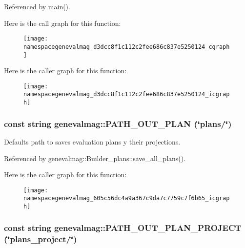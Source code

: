Referenced by main().

Here is the call graph for this function:\nopagebreak
\begin{figure}[H]
\begin{center}
\leavevmode
\texttt{[image: namespacegenevalmag\_d3dcc8f1c112c2fee686c837e5250124\_cgraph]}
\end{center}
\end{figure}


Here is the caller graph for this function:\nopagebreak
\begin{figure}[H]
\begin{center}
\leavevmode
\texttt{[image: namespacegenevalmag\_d3dcc8f1c112c2fee686c837e5250124\_icgraph]}
\end{center}
\end{figure}
\hypertarget{namespacegenevalmag_605c56dc4a9a367c9da7c7759c7f6b65}{
\subsubsection[{PATH\_\-OUT\_\-PLAN}]{\setlength{\rightskip}{0pt plus 5cm}const string genevalmag::PATH\_\-OUT\_\-PLAN (\char`\"{}plans/\char`\"{})}}
\label{namespacegenevalmag_605c56dc4a9a367c9da7c7759c7f6b65}


Defaults path to saves evaluation plans y their projections. 

Referenced by genevalmag::Builder\_\-plans::save\_\-all\_\-plans().

Here is the caller graph for this function:\nopagebreak
\begin{figure}[H]
\begin{center}
\leavevmode
\texttt{[image: namespacegenevalmag\_605c56dc4a9a367c9da7c7759c7f6b65\_icgraph]}
\end{center}
\end{figure}
\hypertarget{namespacegenevalmag_345f3ac168618479f16dbd899562685e}{
\subsubsection[{PATH\_\-OUT\_\-PLAN\_\-PROJECT}]{\setlength{\rightskip}{0pt plus 5cm}const string genevalmag::PATH\_\-OUT\_\-PLAN\_\-PROJECT (\char`\"{}plans\_\-project/\char`\"{})}}
\label{namespacegenevalmag_345f3ac168618479f16dbd899562685e}





